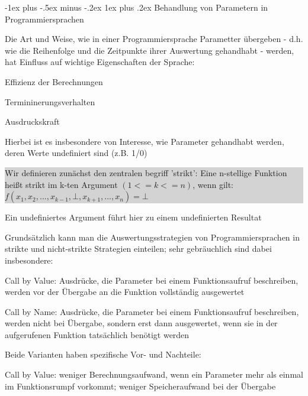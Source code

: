 \documentclass[10pt]{article}
\makeatletter
\renewcommand{\subsubsection}{\@startsection{subsubsection}{3}{0mm}%
                                {-1ex plus -.5ex minus -.2ex}%
                                {1ex plus .2ex}%
                                {\normalfont\small\bfseries}}
\makeatother
\begin{document}
  \subsubsection{Behandlung von Parametern in Programmiersprachen}
  \begin{itemize*}
    \item Die Art und Weise, wie in einer Programmiersprache Parametter übergeben - d.h. wie die Reihenfolge und die Zeitpunkte ihrer Auswertung gehandhabt - werden, hat Einfluss auf wichtige Eigenschaften der Sprache:
    \begin{itemize*}
      \item Effizienz der Berechnungen
      \item Termininerungsverhalten
      \item Ausdruckskraft
    \end{itemize*}
    \item Hierbei ist es insbesondere von Interesse, wie Parameter gehandhabt werden, deren Werte undefiniert sind (z.B. 1/0)\newline
    \colorbox{lightgray}{
      \begin{minipage}[h]{.9\linewidth}
        Wir definieren zunächst den zentralen begriff 'strikt': \newline Eine n-stellige Funktion heißt strikt im k-ten Argument $(1<=k<=n)$, wenn gilt: $f(x_1,x_2,...,x_{k-1},\bot,x_{k+1},...,x_n)=\bot$
      \end{minipage}}
    \item Ein undefiniertes Argument führt hier zu einem undefinierten Resultat
    \item Grundsätzlich kann man die Auswertungsstrategien von Programmiersprachen in strikte und nicht-strikte Strategien einteilen; sehr gebräuchlich sind dabei insbesondere:
    \begin{itemize*}
      \item Call by Value: Ausdrücke, die Parameter bei einem Funktionsaufruf beschreiben, werden vor der Übergabe an die Funktion vollständig ausgewertet
      \item Call by Name: Ausdrücke, die Parameter bei einem Funktionsaufruf beschreiben, werden nicht bei Übergabe, sondern erst dann ausgewertet, wenn sie in der aufgerufenen Funktion tatsächlich benötigt werden
    \end{itemize*}
    \item Beide Varianten haben spezifische Vor- und Nachteile:
    \begin{itemize*}
      \item Call by Value: weniger Berechnungsaufwand, wenn ein Parameter mehr als einmal im Funktionsrumpf vorkommt; weniger Speicheraufwand bei der Übergabe

\end{itemize*}
\end{itemize*}
\end{document}
